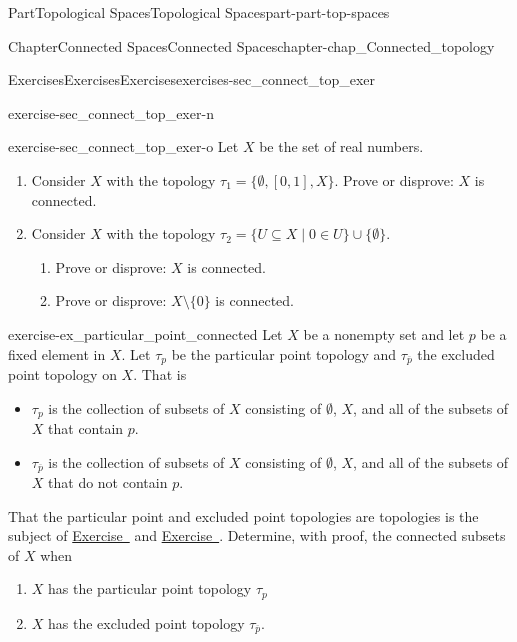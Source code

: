 \documentclass[oneside,10pt,]{book}
\newcommand{\xreffont}{\relax}
\numberwithin{equation}{chapter}
\begin{document}
\begin{partptx}{Part}{Topological Spaces}{}{Topological Spaces}{}{}{part-part-top-spaces}
\begin{chapterptx}{Chapter}{Connected Spaces}{}{Connected Spaces}{}{}{chapter-chap_Connected_topology}
\begin{exercises-section}{Exercises}{Exercises}{}{Exercises}{}{}{exercises-sec_connect_top_exer}
\begin{divisionexercise}{14}{}{}{exercise-sec_connect_top_exer-n}
\begin{enumerate}[font=\bfseries,label=(\alph*),ref=\alph*]
\end{enumerate}%
\end{divisionexercise}%
\begin{divisionexercise}{15}{}{}{exercise-sec_connect_top_exer-o}%
Let \(X\) be the set of real numbers.%
\begin{enumerate}[font=\bfseries,label=(\alph*),ref=\alph*]%
\item{}Consider \(X\) with the topology \(\tau_1 = \{\emptyset, [0,1], X\}\). Prove or disprove: \(X\) is connected.%
\item{}Consider \(X\) with the topology \(\tau_2 = \{U \subseteq X \mid 0 \in U\} \cup \{\emptyset\}\).%
\begin{enumerate}[font=\bfseries,label=(\roman*),ref=\theenumi.\roman*]%
\item{}Prove or disprove: \(X\) is connected.%
\item{}Prove or disprove: \(X \setminus \{0\}\) is connected.%
\end{enumerate}%
\end{enumerate}%
\end{divisionexercise}%
\begin{divisionexercise}{16}{}{}{exercise-ex_particular_point_connected}%
Let \(X\) be a nonempty set and let \(p\) be a fixed element in \(X\). Let \(\tau_p\) be the particular point topology and \(\tau_{\overline{p}}\) the excluded point topology on \(X\). That is%
\begin{itemize}[label=\textbullet]
\item{}\(\tau_{p}\) is the collection of subsets of \(X\) consisting of \(\emptyset\), \(X\), and all of the subsets of \(X\) that contain \(p\).%
\item{}\(\tau_{\overline{p}}\) is the collection of subsets of \(X\) consisting of \(\emptyset\), \(X\), and all of the subsets of \(X\) that do not contain \(p\).%
\end{itemize}
That the particular point and excluded point topologies are topologies is the subject of \hyperlink{exercise-ex_particular_point_topology}{Exercise~{\xreffont 9}} and \hyperlink{exercise-ex_excluded_point_topology}{Exercise~{\xreffont 10}}. Determine, with proof, the connected subsets of \(X\) when%
\begin{enumerate}[font=\bfseries,label=(\alph*),ref=\alph*]%
\item{}\(X\) has the particular point topology \(\tau_p\)%
\item{}\(X\) has the excluded point topology \(\tau_{\overline{p}}\).%
\end{enumerate}%

\end{divisionexercise}
\end{exercises-section}
\end{chapterptx}
\end{partptx}
\end{document}
